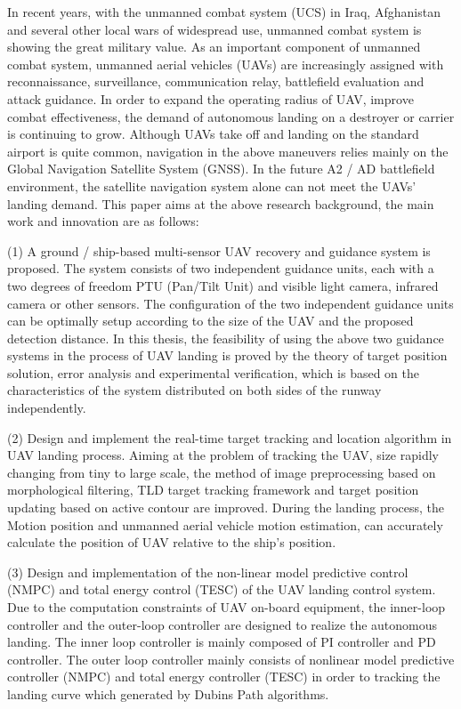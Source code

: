 \begin{eabstract}
In recent years, with the unmanned combat system (UCS) in Iraq, Afghanistan and several other local wars of widespread use, unmanned combat system is showing the great military value. As an important component of unmanned combat system, unmanned aerial vehicles (UAVs) are increasingly assigned with reconnaissance, surveillance, communication relay, battlefield evaluation and attack guidance. In order to expand the operating radius of UAV, improve combat effectiveness, the demand of autonomous landing on a destroyer or carrier is continuing to grow. Although UAVs take off and landing on the standard airport is quite common, navigation in the above maneuvers relies mainly on the Global Navigation Satellite System (GNSS). In the future A2 / AD battlefield environment, the satellite navigation system alone can not meet the UAVs' landing demand. This paper aims at the above research background, the main work and innovation are as follows:
 
(1) A ground / ship-based multi-sensor UAV recovery and guidance system is proposed. The system consists of two independent guidance units, each with a two degrees of freedom PTU (Pan/Tilt Unit) and visible light camera, infrared camera or other sensors. The configuration of the two independent guidance units can be optimally setup according to the size of the UAV and the proposed detection distance. In this thesis, the feasibility of using the above two guidance systems in the process of UAV landing is proved by the theory of target position solution, error analysis and experimental verification, which is based on the characteristics of the system distributed on both sides of the runway independently.

(2) Design and implement the real-time target tracking and location algorithm in UAV landing process. Aiming at the problem of tracking the UAV, size rapidly changing from tiny to large scale, the method of image preprocessing based on morphological filtering, TLD target tracking framework and target position updating based on active contour are improved. During the landing process, the Motion position and unmanned aerial vehicle motion estimation, can accurately calculate the position of UAV relative to the ship's position.

(3) Design and implementation of the non-linear model predictive control (NMPC) and total energy control (TESC) of the UAV landing control system. Due to the computation constraints of UAV on-board equipment, the inner-loop controller and the outer-loop controller are designed to realize the autonomous landing. The inner loop controller is mainly composed of PI controller and PD controller. The outer loop controller mainly consists of nonlinear model predictive controller (NMPC) and total energy controller (TESC) in order to tracking the landing curve which generated by Dubins Path algorithms.


\end{eabstract}
